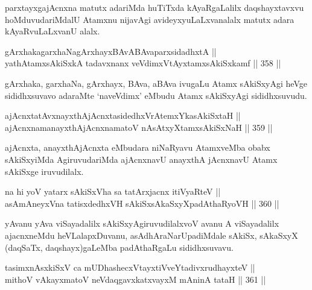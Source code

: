 \begin{artha}
parxtayxgajAcnxna matutx adariMda huTiTxda kAyaRgaLalilx
daqshayxtavxvu hoMduvudariMdalU Atamxnu nijavAgi avideyxyuLaLxvanalalx
matutx adara kAyaRvuLaLxvanU alalx.
\end{artha}

\begin{shl}
gArxhakagarxhaNagArxhayxBAvABAvaparxsidadhxtA || \\
yathA\s \s tamxsAkiSxkA tadavxnanx veVdimxVtAyxtamxsAkiSxkamf \hfill || 358 ||  
\end{shl}

\begin{artha}
gArxhaka, garxhaNa, gArxhayx, BAva, aBAva ivugaLu Atamx sAkiSxyAgi
heVge sididhxsuvavo adaraMte `naveVdimx' eMbudu Atamx sAkiSxyAgi
sididhxsuvudu.
\end{artha}

\begin{shl}
ajAcnxtatAvxnayxthAjAcnxtasidedhxVrAtemxYkasAkiSxtaH || \\
ajAcnxnamanayxthAjAcnxnamatoV nAsAtxyXtamxsAkiSxNaH \hfill || 359 ||  
\end{shl}

\begin{artha}
ajAcnxta, anayxthAjAcnxta eMbudara niNaRyavu AtamxveMba obabx
sAkiSxyiMda AgiruvudariMda ajAcnxnavU anayxthA jAcnxnavU Atamx
sAkiSxge iruvudilalx.
\end{artha}

\begin{shl}
na hi yoV yatarx sAkiSxVha sa tatArxjacnx itiVyaRteV || \\
asAmAneyxVna tatisxdedhxVH sAkiSxsAkaSxyXpadAthaRyoVH \hfill || 360 ||  
\end{shl}

\begin{artha}
yAvanu yAva viSayadalilx sAkiSxyAgiruvudilalxvoV avanu A viSayadalilx
ajacnxneMdu heVLalapxDuvanu, asAdhAraNarUpadiMdale sAkiSx, sAkaSxyX
(daqSaTx, daqshayx)gaLeMba padAthaRgaLu sididhxsuvavu.
\end{artha}


\begin{shl}
tasimxnAsxkiSxV ca mUDhashecxVtayxtiVveYtadivxrudhayxteV || \\
mithoV vAkayxmatoV neVdaqgavxkatxvayxM mAninA tataH \hfill || 361 ||  
\end{shl}

